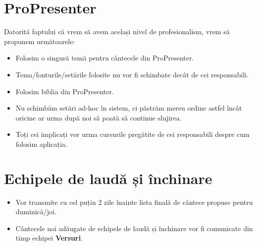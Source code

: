 \documentclass[epjST]{svjour}
\begin{document}
  \section{ProPresenter}
  \label{sec:7} Datorită faptului că vrem să avem același nivel de profesionalism,
  vrem să propunem următoarele:
  \begin{itemize}
    \item Folosim o singură temă pentru cântecele din ProPresenter.

    \item Tema/fonturile/setările folosite nu vor fi schimbate decât de cei responsabili.

    \item Folosim biblia din ProPresenter.

    \item Nu schimbăm setări ad-hoc în sistem, ci păstrăm mereu ordine astfel
      încât oricine ar urma după noi să poată să continue slujirea.

    \item Toți cei implicați vor urma cursurile pregătite de cei responsabili despre
      cum folosim aplicația.
  \end{itemize}

  \section{Echipele de laudă și închinare}
  \label{sec:8}
  \begin{itemize}
    \item Vor transmite cu cel puțin 2 zile înainte lista finală de cântece propuse
      pentru duminică/joi.

    \item Cântecele noi adăugate de echipele de laudă și închinare vor fi comunicate
      din timp echipei \textbf{Versuri}.
  \end{itemize}
\end{document}
